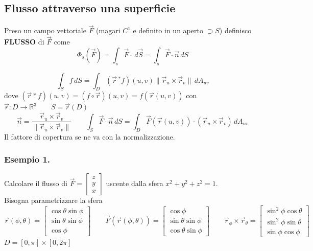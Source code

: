 \documentclass[10pt]{article}
\theoremstyle{plain}
\theoremstyle{definition}
\begin{document}
\subsection{Flusso attraverso una superficie}
Preso un campo vettoriale $\vec{F}$ (magari $C^1$ e definito in un aperto $\supset S$) definisco \textbf{FLUSSO} di $\vec{F}$ come
$$\Phi_s(\vec{F}) = \int_s \vec{F} \cdot \,d\vec{S} = \int_s \vec{F} \cdot \vec{n} \,dS$$

$$\int_S f\,dS \doteq \int_D (\vec{r}\,^*f)(u,v) \| \vec{r}_u \times \vec{r}_v \| \,dA_{uv}$$
dove $(\vec{r}*f)(u,v) = (f \circ \vec{r})(u,v) = f(\vec{r}(u,v))$ con $\vec{r}:D \rightarrow \mathbb{R}^3 \qquad S=\vec{r}(D)$
$$\vec{n}=\frac{\vec{r}_u \times \vec{r}_v}{\| \vec{r}_u \times \vec{r}_v \|} \qquad \int_S \vec{F} \cdot \vec{n} \,dS = \int_D \vec{F}(\vec{r}(u,v)) \cdot (\vec{r}_u \times \vec{r}_v)\,dA_{uv}$$
Il fattore di copertura se ne va con la normalizzazione.\\
\subsubsection{Esempio 1.}
Calcolare il flusso di $\vec{F} = \begin{bmatrix} z \\ y \\ x\end{bmatrix}$ uscente dalla sfera $x^2 +y^2 +z^2 =1$.\\
Bisogna parametrizzare la sfera
$$\vec{r}(\phi, \theta) = \begin{bmatrix} \cos\theta \sin\phi \\ \sin\theta \sin\phi \\ \cos\phi \end{bmatrix} \qquad \vec{F}(\vec{r}(\phi,\theta))=\begin{bmatrix} \cos\phi \\ \sin\theta \sin\phi \\ \cos\theta \sin\phi \end{bmatrix} \qquad \vec{r}_{\phi} \times \vec{r}_{\theta} = \begin{bmatrix} \sin^2\phi \cos\theta \\ \sin^2\phi \sin\theta \\ \sin\phi \cos\phi \end{bmatrix}$$
\newline
\newline
$D = [0,\pi] \times [0,2\pi]$
\end{document}
